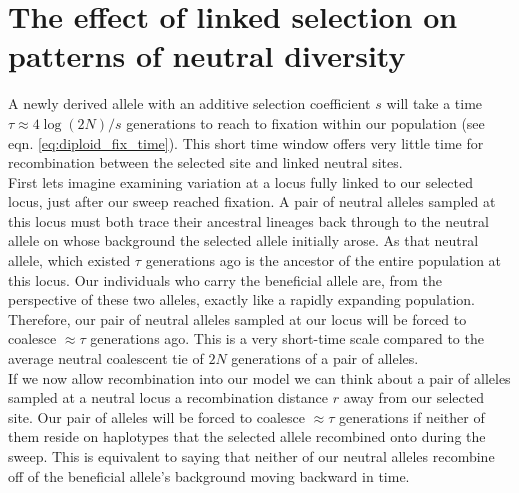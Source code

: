 \section{The effect of linked selection on patterns of neutral diversity}

A newly derived allele with an additive selection coefficient $s$ will
take a time $\tau \approx 4\log(2N)/s$ generations to reach to fixation
within our population (see eqn. \eqref{eq:diploid_fix_time}). This short time window offers very little time
for recombination between the selected site and linked neutral
sites.  \\

First lets imagine examining variation at a locus fully linked
to our selected locus, just after our sweep reached fixation. A pair of neutral alleles sampled at this locus
must both trace their ancestral lineages back through to the neutral
allele on whose background the selected allele initially arose. As
that neutral allele, which existed $\tau$ generations ago is the
ancestor of the entire population at this locus. Our individuals who
carry the beneficial allele are, from the perspective of these two
alleles, exactly like a rapidly expanding population. Therefore, our
pair of neutral alleles sampled at our locus will be forced to
coalesce $\approx \tau$ generations ago. This is a very
short-time scale compared to the average neutral coalescent tie of
$2N$ generations of a pair of alleles.\\

If we now allow recombination into our model we can think about a pair
of alleles sampled at a neutral locus a recombination distance $r$
away from our selected site. Our pair of alleles will be forced to
coalesce $\approx \tau$ generations if neither of them reside on
haplotypes that the selected allele recombined onto during the
sweep. This is equivalent to saying that neither of our neutral
alleles recombine off of the beneficial allele's background moving
backward in time.\\

